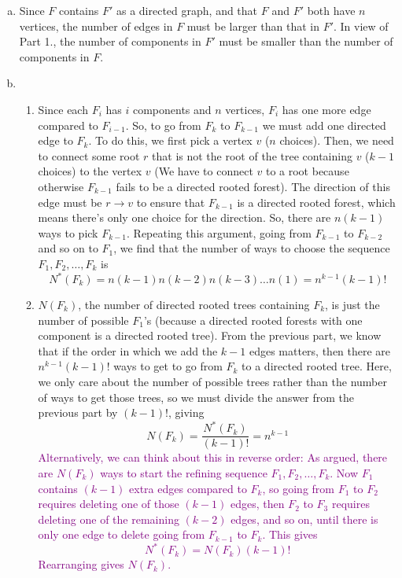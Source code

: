\documentclass[11pt]{article}
\newcommand{\f}[2]{\frac{#1}{#2}}
\begin{document}
\begin{enumerate}[(a)]
	\item Since $F$ contains $F'$ as a directed graph, and that $F$ and $F'$ both have $n$ vertices, the number of edges in $F$ must be larger than that in $F'$. In view of Part 1., the number of components in $F'$ must be smaller than the number of components in $F$. 
	
	
	\item 
	\begin{enumerate}[1.]
		\item Since each $F_i$ has $i$ components and $n$ vertices, $F_{i}$ has one more edge compared to $F_{i-1}$. So, to go from $F_{k}$ to $F_{k-1}$ we must add one directed edge to $F_k$. To do this, we first pick a vertex $v$ ($n$ choices). Then, we need to connect some root $r$ that is not the root of the tree containing $v$ ($k-1$ choices) to the vertex $v$ (We have to connect $v$ to a root because otherwise $F_{k-1}$ fails to be a directed rooted forest). The direction of this edge must be $r\to v$ to ensure that $F_{k-1}$ is a directed rooted forest, which means there's only one choice for the direction. So, there are $n(k-1)$ ways to pick $F_{k-1}$. Repeating this argument, going from $F_{k-1}$ to $F_{k-2}$ and so on to $F_1$, we find that the number of ways to choose the sequence $F_1, F_2, \dots, F_k$ is 
		\begin{equation*}
		N^*(F_k) = n(k-1)n(k-2)n(k-3)\dots n(1) = \boxed{n^{k-1}(k-1)!}
		\end{equation*}
		
		\item $N(F_k)$, the number of directed rooted trees containing $F_k$, is just the number of possible $F_1$'s (because a directed rooted forests with one component is a directed rooted tree). From the previous part, we know that if the order in which we add the $k-1$ edges matters, then there are $n^{k-1}(k-1)!$ ways to get to go from $F_k$ to a directed rooted tree. Here, we only care about the number of possible trees rather than the number of ways to get those trees, so we must divide the answer from the previous part by $(k-1)!$, giving
		\begin{equation*}
		N(F_k) = \f{N^*(F_k)}{(k-1)!} = \boxed{n^{k-1}}
		\end{equation*}
		\textcolor{purple}{Alternatively, we can think about this in reverse order: As argued, there are $N(F_k)$ ways to start the refining sequence $F_1, F_2, \dots, F_k$. Now $F_1$ contains $(k-1)$ extra edges compared to $F_k$, so going from $F_1$ to $F_2$ requires deleting one of those $(k-1)$ edges, then $F_2$ to $F_3$ requires deleting one of the remaining $(k-2)$ edges, and so on, until there is only one edge to delete going from $F_{k-1}$ to $F_k$. This gives 
		\begin{equation*}
		N^*(F_k) = N(F_k)(k-1)!
		\end{equation*}
		Rearranging gives $N(F_k)$.}
		

\end{enumerate}
\end{enumerate}
\end{document}
